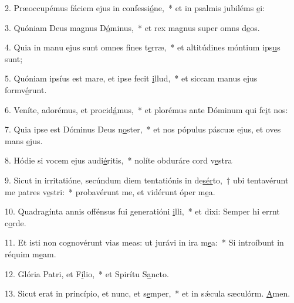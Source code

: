 2. Præoccupémus fáciem ejus in confessi\uline{ó}ne,~* et in psalmis jubiléms \uline{e}i:\par 
3. Quóniam Deus magnus D\uline{ó}minus,~* et rex magnus super omns d\uline{e}os.\par 
4. Quia in manu ejus sunt omnes fines t\uline{e}rræ,~* et altitúdines móntium ips\uline{u}s sunt;\par 
5. Quóniam ipsíus est mare, et ipse fecit \uline{i}llud,~* et siccam manus ejus formv\uline{é}runt.\par 
6. Veníte, adorémus, et procid\uline{á}mus,~* et plorémus ante Dóminum qui fc\uline{i}t nos:\par 
7. Quia ipse est Dóminus Deus n\uline{o}ster,~* et nos pópulus páscuæ ejus, et oves mans \uline{e}jus.\par 
8. Hódie si vocem ejus audi\uline{é}ritis,~* nolíte obduráre cord v\uline{e}stra\par 
9. Sicut in irritatióne, secúndum diem tentatiónis in de\uline{sér}to,~† ubi tentavérunt me patres v\uline{e}stri:~* probavérunt me, et vidérunt óper m\uline{e}a.\par 
10. Quadragínta annis offénsus fui generatióni \uline{i}lli,~* et dixi: Semper hi errnt c\uline{o}rde.\par 
11. Et isti non cognovérunt vias meas: ut jurávi in ira m\uline{e}a:~* Si introíbunt in réquim m\uline{e}am.\par 
12. Glória Patri, et F\uline{í}lio,~* et Spirítu S\uline{a}ncto.\par 
13. Sicut erat in princípio, et nunc, et s\uline{e}mper,~* et in sǽcula sæculórm. \uline{A}men.\par 
